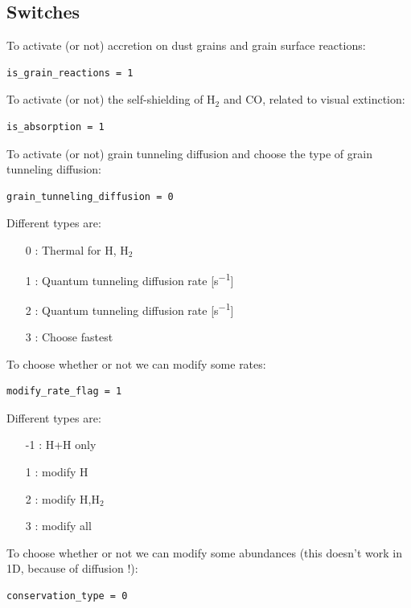 \documentclass[english,a4paper,twoside]{article}
\newcommand{\molecule}[1]{\ensuremath{\mathrm{#1}}}
\begin{document}
\subsection{Switches}
To activate (or not) accretion on dust grains and grain surface reactions:
\begin{verbatim}
is_grain_reactions = 1
\end{verbatim}

To activate (or not) the self-shielding of $\molecule{H_2}$ and $\molecule{CO}$, related to visual extinction: 
\begin{verbatim}
is_absorption = 1
\end{verbatim}

To activate (or not) grain tunneling diffusion and choose the type of grain tunneling diffusion: 
\begin{verbatim}
grain_tunneling_diffusion = 0
\end{verbatim}

Different types are:
\begin{itemize}
\item[0] : Thermal for H, \molecule{H_2}
\item[1] : Quantum tunneling diffusion rate [\unit{s^{-1}}] \citep{1976RvMP...48..513W}
\item[2] : Quantum tunneling diffusion rate [\unit{s^{-1}}] \citep{1992ApJS...82..167H}
\item[3] : Choose fastest
\end{itemize}

To choose whether or not we can modify some rates:
\begin{verbatim}
modify_rate_flag = 1
\end{verbatim}

Different types are:
\begin{itemize}
\item[-1] : H+H only
\item[1] : modify H
\item[2] : modify H,\molecule{H_2}
\item[3] : modify all
\end{itemize}

To choose whether or not we can modify some abundances (this doesn't work in 1D, because of diffusion !):
\begin{verbatim}
conservation_type = 0
\end{verbatim}
\end{document}
